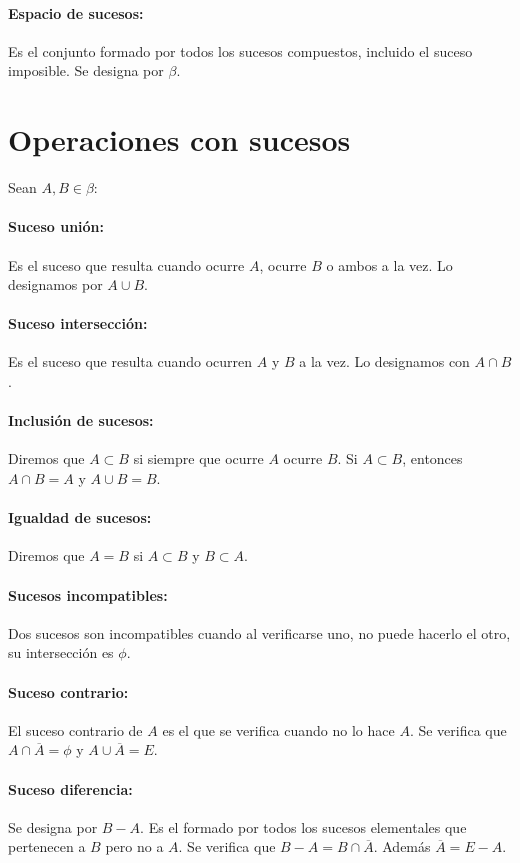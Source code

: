 \documentclass[12pt,a4paper,oneside,onecolumn,titlepage]{book}
\begin{document}
\paragraph{Espacio de sucesos:}
Es el conjunto formado por todos los sucesos compuestos, incluido el suceso imposible. Se designa por $\beta$.


\section{Operaciones con sucesos}
Sean $A,B \in \beta$:
\paragraph{Suceso unión:} Es el suceso que resulta cuando ocurre $A$, ocurre $B$ o ambos a la vez. Lo designamos por $A \cup B$.
\paragraph{Suceso intersección:} Es el suceso que resulta cuando ocurren $A$ y $B$ a la vez. Lo designamos con $A \cap B$.
\paragraph{Inclusión de sucesos:} Diremos que $A \subset B$ si siempre que ocurre $A$ ocurre $B$. Si $A \subset B$, entonces $A \cap B = A$ y $A \cup B = B$.
\paragraph{Igualdad de sucesos:}Diremos que $A = B$ si $A \subset B$ y $B \subset A$.
\paragraph{Sucesos incompatibles:} Dos sucesos son incompatibles cuando al verificarse uno, no puede hacerlo el otro, su intersección es $\phi$.
\paragraph{Suceso contrario:} El suceso contrario de $A$ es el que se verifica cuando no lo hace $A$. Se verifica que $A \cap \overline{A} = \phi$ y $A \cup \overline{A} = E$.
\paragraph{Suceso diferencia:} Se designa por $B - A$. Es el formado por todos los sucesos elementales que pertenecen a $B$ pero no a $A$. Se verifica que $B - A = B \cap \overline{A}$. Además $\overline{A} = E - A$.
\end{document}
